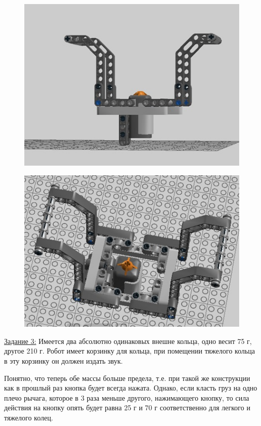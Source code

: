 \begin{figure}[h!]
	\begin{center}
		\includegraphics[width=0.8\linewidth]{chapters/chapter20/images/5}
		\caption{}
		\label{ris:image20x5}
	\end{center}
\end{figure}

\begin{figure}[h!]
	\begin{center}
		\includegraphics[width=0.8\linewidth]{chapters/chapter20/images/6}
		\caption{}
		\label{ris:image20x6}
	\end{center}
\end{figure}

\noindent\underline{Задание 3:} Имеется два абсолютно одинаковых внешне кольца, одно весит 75 г, другое 210 г. Робот имеет корзинку для кольца, при помещении тяжелого кольца в эту корзинку он должен издать звук.

Понятно, что теперь обе массы больше предела, т.е. при такой же конструкции как в прошлый раз кнопка будет всегда нажата. Однако, если класть груз на одно плечо рычага, которое в 3 раза меньше другого, нажимающего кнопку, то сила действия на кнопку опять будет равна 25 г и 70 г соответственно для легкого и тяжелого колец.\\\\

